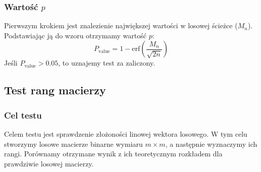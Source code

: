 \subsubsection{Wartość $p$}
Pierwszym krokiem jest znalezienie największej wartości w losowej ścieżce ($M_n$). Podstawiając ją do wzoru otrzymamy wartość $p$:
\begin{equation}
    P_{\textrm{value}} = 1 - \textrm{erf}\left(\frac{M_n}{\sqrt{2n}}\right)
\end{equation}
Jeśli $P_{\textrm{value}} > 0.05$, to uznajemy test za zaliczony.
\subsection{Test rang macierzy}
\subsubsection{Cel testu}
Celem testu jest sprawdzenie złożoności linowej wektora losowego. W tym celu stworzymy losowe macierze binarne wymiaru $m \times m$, a następnie wyznaczymy ich rangi. Porównamy otrzymane wynik z ich teoretycznym rozkładem dla prawdziwie losowej macierzy.
